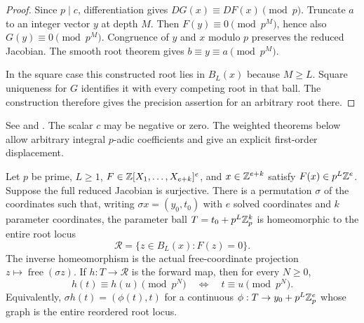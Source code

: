 \begin{proof}
Since $p\mid c$, differentiation gives
$DG(x)\equiv DF(x)\pmod p$. Truncate $a$ to an integer vector $y$ at
depth $M$. Then $F(y)\equiv0\pmod{p^M}$, hence also
$G(y)\equiv0\pmod{p^M}$. Congruence of $y$ and $x$ modulo $p$ preserves
the reduced Jacobian. The smooth root theorem gives
$b\equiv y\equiv a\pmod{p^M}$.

In the square case this constructed root lies in $B_L(x)$ because $M\ge L$.
Square uniqueness for $G$ identifies it with every competing root in that
ball. The construction therefore gives the precision assertion for an
arbitrary root there.
\end{proof}

See 
and .
The scalar $c$ may be negative or zero. The weighted theorems below allow
arbitrary integral $p$-adic coefficients and give an explicit first-order
displacement.

\begin{theorem}
\label{thm:continuous-parameter-chart}
Let $p$ be prime, $L\ge1$,
$F\in\mathbb Z[X_1,\ldots,X_{e+k}]^e$, and $x\in\mathbb Z^{e+k}$ satisfy
$F(x)\in p^L\mathbb Z^e$. Suppose the full reduced Jacobian is surjective.
There is a permutation $\sigma$ of the coordinates such that, writing
$\sigma x=(y_0,t_0)$ with $e$ solved coordinates and $k$ parameter
coordinates, the parameter ball
$T=t_0+p^L\mathbb Z_p^k$ is homeomorphic to the entire root locus
\[
 \mathcal R=\{z\in B_L(x):F(z)=0\}.
\]
The inverse homeomorphism is the actual free-coordinate projection
$z\mapsto\operatorname{free}(\sigma z)$. If $h:T\to\mathcal R$ is the
forward map, then for every $N\ge0$,
\begin{equation}\label{eq:chart-congruence}
 h(t)\equiv h(u)\pmod{p^N}
 \quad\Longleftrightarrow\quad t\equiv u\pmod{p^N}.
\end{equation}
Equivalently, $\sigma h(t)=(\phi(t),t)$ for a continuous
$\phi:T\to y_0+p^L\mathbb Z_p^e$ whose graph is the entire reordered root locus.
\end{theorem}

